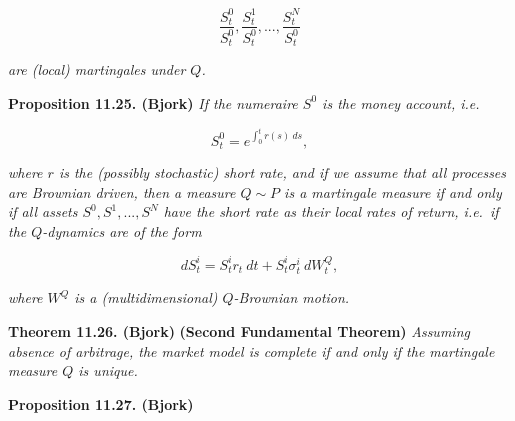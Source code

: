 \documentclass[a4paper,12pt,openany]{book}
\begin{document}
\[
\frac{S_t^0}{S_t^0},\frac{S_t^1}{S_t^0},...,\frac{S_t^N}{S_t^0}
\]

\emph{are (local) martingales under \(Q\).}

\textbf{Proposition 11.25. (Bjork)} \emph{If the numeraire \(S^0\) is the money account, i.e.}

\[
S^0_t=e^{\int_0^t r(s)\ ds},
\]

\emph{where \(r\) is the (possibly stochastic) short rate, and if we assume that all processes are Brownian driven, then a measure \(Q\sim P\) is a martingale measure if and only if all assets \(S^0,S^1,...,S^N\) have the short rate as their local rates of return, i.e.~if the \(Q\)-dynamics are of the form}

\[
dS_t^i=S_t^ir_t\ dt+S_t^i \sigma_t^i\ dW_t^Q,\tag{11.54}
\]

\emph{where \(W^Q\) is a (multidimensional) \(Q\)-Brownian motion.}

\textbf{Theorem 11.26. (Bjork)} \textbf{(Second Fundamental Theorem)} \emph{Assuming absence of arbitrage, the market model is complete if and only if the martingale measure \(Q\) is unique.}

\textbf{Proposition 11.27. (Bjork)}
\end{document}
